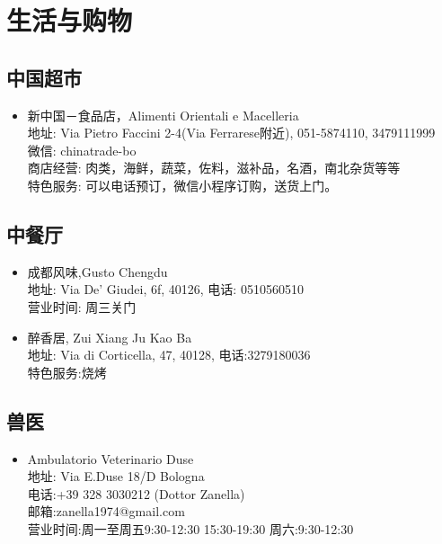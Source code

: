 \chapter{生活与购物}              



\section{中国超市}
\begin{itemize}
\item 新中国－食品店，Alimenti Orientali e Macelleria\\
地址: Via Pietro Faccini 2-4(Via Ferrarese附近), 051-5874110, 3479111999\\
微信: chinatrade-bo\\
商店经营: 肉类，海鲜，蔬菜，佐料，滋补品，名酒，南北杂货等等\\
特色服务: 可以电话预订，微信小程序订购，送货上门。
\end{itemize}

\section{中餐厅}
\begin{itemize}
\item 成都风味,Gusto Chengdu\\
地址: Via De' Giudei, 6f, 40126, 电话: 0510560510 \\
营业时间: 周三关门\\

\item 醉香居, Zui Xiang Ju Kao Ba\\
地址: Via di Corticella, 47, 40128, 电话:3279180036\\
特色服务:烧烤\\

\end{itemize}


\section{兽医}
\begin{itemize}
\item Ambulatorio Veterinario Duse\\
地址: Via E.Duse 18/D Bologna\\
电话:+39 328 3030212 (Dottor Zanella)\\
邮箱:zanella1974@gmail.com\\
营业时间:周一至周五9:30-12:30  15:30-19:30  周六:9:30-12:30\\
\end{itemize}

